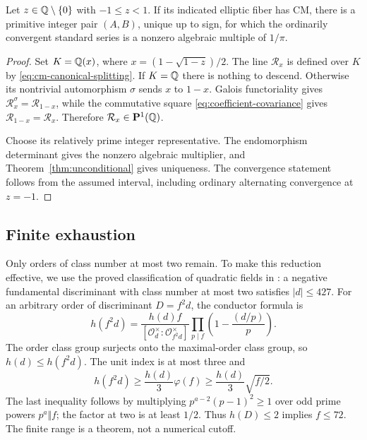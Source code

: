 \begin{theorem}
\label{thm:rational-cm-existence}
Let $z\in\mathbb Q\setminus\{0\}$ with $-1\le z<1$.  If its indicated
elliptic fiber has CM, there is a primitive integer pair $(A,B)$,
unique up to sign, for which the ordinarily convergent standard
series is a nonzero algebraic multiple of $1/\pi$.
\end{theorem}
\begin{proof}
Set $K=\mathbb Q(x)$, where $x=(1-\sqrt{1-z})/2$.  The line
$\mathcal R_x$ is defined over $K$ by
\eqref{eq:cm-canonical-splitting}.  If $K=\mathbb Q$ there is nothing
to descend.  Otherwise its nontrivial automorphism $\sigma$ sends
$x$ to $1-x$.  Galois functoriality gives
$\mathcal R_x^\sigma=\mathcal R_{1-x}$, while the commutative
square \eqref{eq:coefficient-covariance} gives
$\mathcal R_{1-x}=\mathcal R_x$.  Therefore
$\mathcal R_x\in\mathbf P^1(\mathbb Q)$.

Choose its relatively prime integer representative.  The
endomorphism determinant gives the nonzero algebraic multiplier,
and Theorem~\ref{thm:unconditional} gives uniqueness.  The
convergence statement follows from the assumed interval, including
ordinary alternating convergence at $z=-1$.
\end{proof}

\subsection{Finite exhaustion}

Only orders of class number at most two remain.  To make this
reduction effective, we use the proved classification of quadratic
fields in \cite{Watkins}: a negative fundamental discriminant with
class number at most two satisfies $|d|\le427$.  For an arbitrary
order of discriminant $D=f^2d$, the conductor formula is
\begin{equation}\label{eq:conductor-packet}
 h(f^2d)=\frac{h(d)f}{[\mathcal O_d^\times:
                              \mathcal O_{f^2d}^\times]}
            \prod_{p\mid f}\left(1-\frac{(d/p)}p\right).
\end{equation}
The order class group surjects onto the maximal-order class group,
so $h(d)\le h(f^2d)$.  The unit index is at most three and
\begin{equation}\label{eq:conductor-bound-packet}
 h(f^2d)\ge\frac{h(d)}3\varphi(f)
                  \ge\frac{h(d)}3\sqrt{f/2}.
\end{equation}
The last inequality follows by multiplying
$p^{a-2}(p-1)^2\ge1$ over odd prime powers $p^a\Vert f$;
the factor at two is at least $1/2$.  Thus $h(D)\le2$ implies
$f\le72$.  The finite range is a theorem, not a numerical cutoff.

